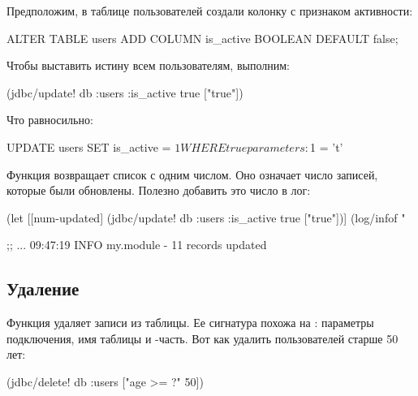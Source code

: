 Предположим, в таблице пользователей создали колонку с признаком активности:

\begin{english}
  \begin{sql}
ALTER TABLE users
ADD COLUMN is_active BOOLEAN DEFAULT false;
  \end{sql}
\end{english}

Чтобы выставить истину всем пользователям, выполним:

\begin{english}
  \begin{clojure}
(jdbc/update! db
              :users
              {:is_active true}
              ["true"])
  \end{clojure}
\end{english}

Что равносильно:

\begin{english}
  \begin{sql}
UPDATE users SET is_active = $1 WHERE true
parameters: $1 = 't'
  \end{sql}
\end{english}

Функция  возвращает список с одним числом. Оно означает число записей, которые были обновлены. Полезно добавить это число в лог:

\begin{english}
  \begin{clojure}
(let [[num-updated]
      (jdbc/update! db :users
                    {:is_active true} ["true"])]
  (log/infof "%

;; ... 09:47:19 INFO  my.module - 11 records updated
  \end{clojure}
\end{english}

\subsection{Удаление}

Функция  удаляет записи из таблицы. Ее сигнатура похожа на : параметры подключения, имя таблицы и -часть. Вот как удалить пользователей старше 50 лет:

\begin{english}
  \begin{clojure}
(jdbc/delete! db :users ["age >= ?" 50])
  \end{clojure}
\end{english}

